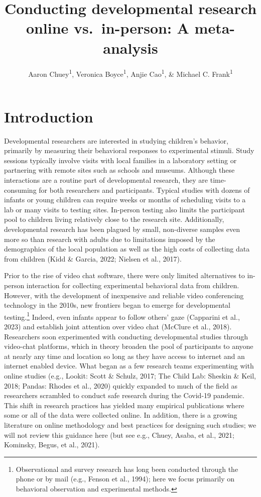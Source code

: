 \documentclass[
  man,floatsintext]{apa6}
\title{Conducting developmental research online vs.~in-person: A meta-analysis}
\author{Aaron Chuey\textsuperscript{1}, Veronica Boyce\textsuperscript{1}, Anjie Cao\textsuperscript{1}, \& Michael C. Frank\textsuperscript{1}}
\date{}
\affiliation{\vspace{0.5cm}\textsuperscript{1} Stanford University, Department of Psychology}
\begin{document}
\maketitle

\hypertarget{introduction}{%
\section{Introduction}\label{introduction}}

Developmental researchers are interested in studying children's behavior, primarily by measuring their behavioral responses to experimental stimuli. Study sessions typically involve visits with local families in a laboratory setting or partnering with remote sites such as schools and museums. Although these interactions are a routine part of developmental research, they are time-consuming for both researchers and participants. Typical studies with dozens of infants or young children can require weeks or months of scheduling visits to a lab or many visits to testing sites. In-person testing also limits the participant pool to children living relatively close to the research site. Additionally, developmental research has been plagued by small, non-diverse samples even more so than research with adults due to limitations imposed by the demographics of the local population as well as the high costs of collecting data from children (Kidd \& Garcia, 2022; Nielsen et al., 2017).

Prior to the rise of video chat software, there were only limited alternatives to in-person interaction for collecting experimental behavioral data from children. However, with the development of inexpensive and reliable video conferencing technology in the 2010s, new frontiers began to emerge for developmental testing.\footnote{Observational and survey research has long been conducted through the phone or by mail (e.g., Fenson et al., 1994); here we focus primarily on behavioral observation and experimental methods.} Indeed, even infants appear to follow others' gaze (Capparini et al., 2023) and establish joint attention over video chat (McClure et al., 2018). Researchers soon experimented with conducting developmental studies through video-chat platforms, which in theory broaden the pool of participants to anyone at nearly any time and location so long as they have access to internet and an internet enabled device. What began as a few research teams experimenting with online studies (e.g., Lookit: Scott \& Schulz, 2017; The Child Lab: Sheskin \& Keil, 2018; Pandas: Rhodes et al., 2020) quickly expanded to much of the field as researchers scrambled to conduct safe research during the Covid-19 pandemic. This shift in research practices has yielded many empirical publications where some or all of the data were collected online. In addition, there is a growing literature on online methodology and best practices for designing such studies; we will not review this guidance here (but see e.g., Chuey, Asaba, et al., 2021; Kominsky, Begus, et al., 2021).
\end{document}
